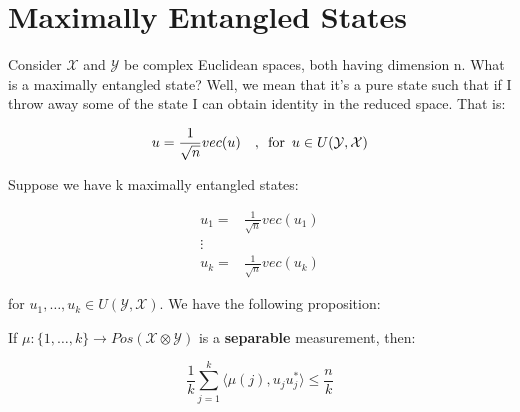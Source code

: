 \documentclass{article}
\begin{document}
\section*{Maximally Entangled States}

Consider $\mathcal{X}$ and $ \mathcal{Y} $ be complex Euclidean spaces, both
having dimension n. What is a maximally entangled state? Well, we mean that it's
a pure state such that if I throw away some of the state I can obtain identity
in the reduced space. That is:

\[ 
    u = \frac{1}{\sqrt{n}} vec(u) \quad,\enskip \text{for} \enskip u \in
    U(\mathcal{Y},\mathcal{X})
\]

Suppose we have k maximally entangled states:

\begin{align*}
    u_1=& \frac{1}{\sqrt{n}} vec(u_1) \\ 
    \vdots& \\
    u_k =& \frac{1}{\sqrt{n}} vec(u_k)
\end{align*}

for $u_1,\ldots,u_k \in U(\mathcal{Y}, \mathcal{X})$. We have the following
proposition:

If $\mu:\{1,\ldots,k\} \rightarrow Pos(\mathcal{X}\otimes \mathcal{Y})$ is a
\textbf{separable} measurement, then:

\[ 
    \frac{1}{k} \sum^{k}_{j=1}\langle \mu(j) , u_j u_j^* \rangle  \le \frac{n}{k}
\]
\end{document}
